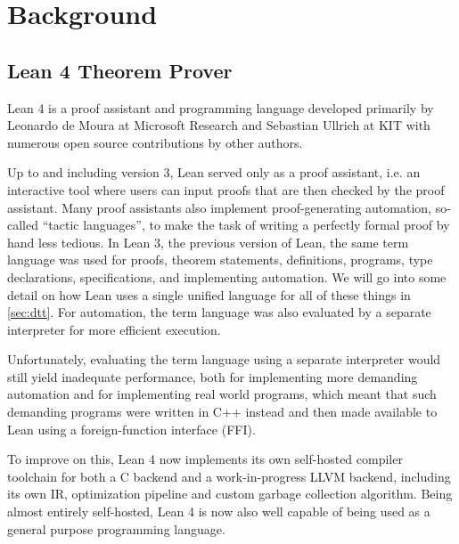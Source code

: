 \chapter{Background}\label{sec:background}

\section{Lean 4 Theorem Prover}
Lean 4 is a proof assistant and programming language developed primarily by Leonardo de Moura at Microsoft Research and Sebastian Ullrich at KIT with numerous open source contributions by other authors.

Up to and including version 3, Lean served only as a proof assistant, i.e. an interactive tool where users can input proofs that are then checked by the proof assistant. Many proof assistants also implement proof-generating automation, so-called ``tactic languages'', to make the task of writing a perfectly formal proof by hand less tedious. In Lean 3, the previous version of Lean, the same term language was used for proofs, theorem statements, definitions, programs, type declarations, specifications, and implementing automation. We will go into some detail on how Lean uses a single unified language for all of these things in \cref{sec:dtt}. For automation, the term language was also evaluated by a separate interpreter for more efficient execution.

Unfortunately, evaluating the term language using a separate interpreter would still yield inadequate performance, both for implementing more demanding automation and for implementing real world programs, which meant that such demanding programs were written in C++ instead and then made available to Lean using a foreign-function interface (FFI). \citep{ullrich_counting_2020}

To improve on this, Lean 4 now implements its own self-hosted compiler toolchain for both a C backend and a work-in-progress LLVM backend, including its own IR, optimization pipeline and custom garbage collection algorithm. Being almost entirely self-hosted, Lean 4 is now also well capable of being used as a general purpose programming language.

